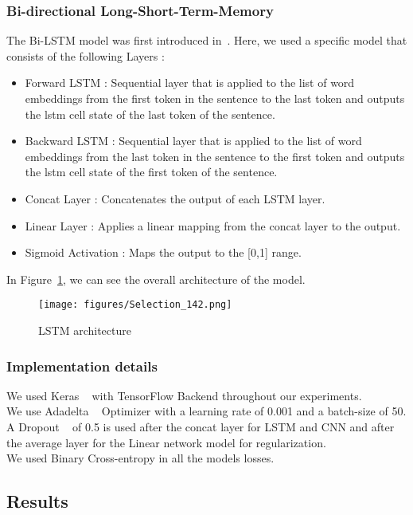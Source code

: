 \documentclass[11pt,a4paper]{article}
\begin{document}
\subsubsection{Bi-directional Long-Short-Term-Memory}
The Bi-LSTM model was first introduced in~\cite{graves2005framewise}. Here, we used a specific model that consists of the following Layers : 
\begin{itemize}
\item Forward LSTM : Sequential layer that is applied to the list of word embeddings from the first token in the sentence to the last token and outputs the lstm cell state of the last token of the sentence.
\item Backward LSTM : Sequential layer that is applied to the list of word embeddings from the last token in the sentence to the first token and outputs the lstm cell state of the first token of the sentence.
\item Concat Layer : Concatenates the output of each LSTM layer.
\item Linear Layer : Applies a linear mapping from the concat layer to the output.
\item Sigmoid Activation : Maps the output to the [0,1] range.
\end{itemize}
In Figure~\ref{fig:model_lstm}, we can see the overall architecture of the model. 
\begin{figure}[h!]
  \centering
    \texttt{[image: figures/Selection\_142.png]}
    \caption{LSTM architecture}
    \label{fig:model_lstm}
\end{figure}

\subsubsection{Implementation details}
We used Keras ~\cite{chollet2015keras} with TensorFlow Backend throughout our experiments.\\
We use Adadelta ~\cite{journals/corr/abs-1212-5701} Optimizer with a learning rate of 0.001 and a batch-size of 50.\\
A Dropout ~\cite{Srivastava:2014:DSW:2627435.2670313} of 0.5 is used after the concat layer for LSTM and CNN and after
the average layer for the Linear network model for regularization.\\
We used Binary Cross-entropy in all the models losses.


\subsection{Results}\label{results}
\end{document}
